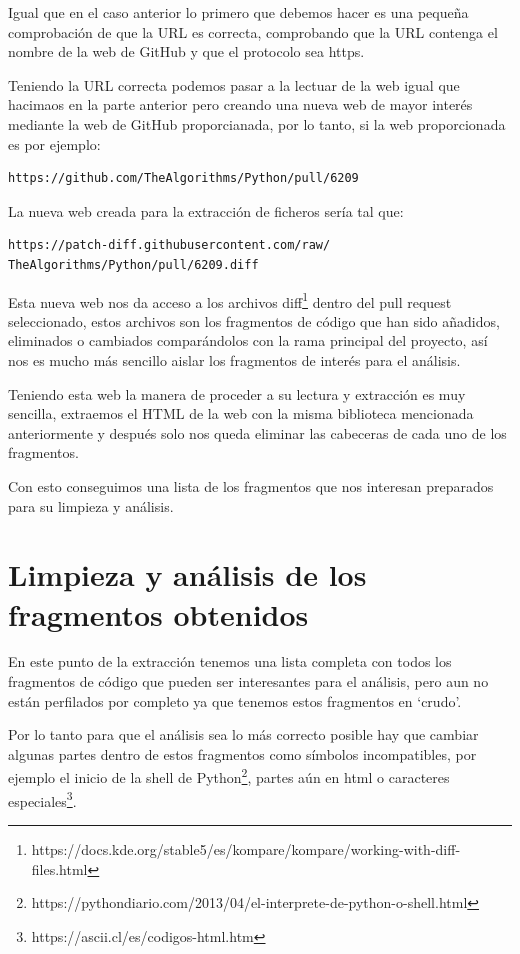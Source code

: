 \documentclass[a4paper, 12pt]{book}
\begin{document}
Igual que en el caso anterior lo primero que debemos hacer es una pequeña comprobación de que la URL es correcta, comprobando que la URL contenga el nombre de la web de GitHub y que el protocolo sea https.

Teniendo la URL correcta podemos pasar a la lectuar de la web igual que hacimaos en la parte anterior pero creando una nueva web de mayor interés mediante la web de GitHub proporcianada, por lo tanto, si la web proporcionada es por ejemplo:
\begin{verbatim}
https://github.com/TheAlgorithms/Python/pull/6209
\end{verbatim}

La nueva web creada para la extracción de ficheros sería tal que:

\begin{verbatim}
https://patch-diff.githubusercontent.com/raw/
TheAlgorithms/Python/pull/6209.diff
\end{verbatim} 

Esta nueva web nos da acceso a los archivos diff\footnote{https://docs.kde.org/stable5/es/kompare/kompare/working-with-diff-files.html} dentro del pull request seleccionado, estos archivos son los fragmentos de código que han sido añadidos, eliminados o cambiados comparándolos con la rama principal del proyecto, así nos es mucho más sencillo aislar los fragmentos de interés para el análisis.

Teniendo esta web la manera de proceder a su lectura y extracción es muy sencilla, extraemos el HTML de la web con la misma biblioteca mencionada anteriormente y después solo nos queda eliminar las cabeceras de cada uno de los fragmentos.

Con esto conseguimos una lista de los fragmentos que nos interesan preparados para su limpieza y análisis.

\section{Limpieza y análisis de los fragmentos obtenidos} 
\label{sec:limpieza y análisis de los fragmentos obtenidos}

En este punto de la extracción tenemos una lista completa con todos los fragmentos de código que pueden ser interesantes para el análisis, pero aun no están perfilados por completo ya que tenemos estos fragmentos en `crudo'.

Por lo tanto para que el análisis sea lo más correcto posible hay que cambiar algunas partes dentro de estos fragmentos como símbolos incompatibles, por ejemplo el inicio de la shell de Python\footnote{https://pythondiario.com/2013/04/el-interprete-de-python-o-shell.html}, partes aún en html o caracteres especiales\footnote{https://ascii.cl/es/codigos-html.htm}.
\end{document}
